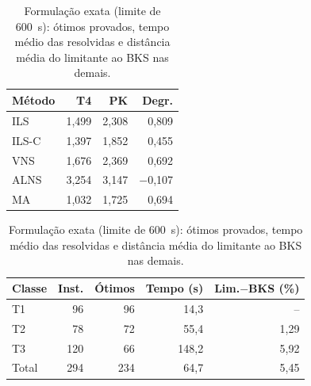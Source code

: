 \begin{table}[t]
\centering
\footnotesize
\setlength{\tabcolsep}{4pt}
\begin{minipage}[t]{0.42\textwidth}\centering
\caption{H3: gap médio ao BKS (\%) em T4 e PK e degradação (p.p.).}
\label{tab:h3}
\begin{tabular}{lrrr}
\toprule
Método & T4 & PK & Degr. \\
\midrule
ILS & 1,499 & 2,308 & 0,809 \\
ILS-C & 1,397 & 1,852 & 0,455 \\
VNS & 1,676 & 2,369 & 0,692 \\
ALNS & 3,254 & 3,147 & $-$0,107 \\
MA & 1,032 & 1,725 & 0,694 \\
\bottomrule
\end{tabular}
\end{minipage}\hfill
\begin{minipage}[t]{0.55\textwidth}\centering
\caption{Formulação exata (limite de 600~s): ótimos provados, tempo médio das resolvidas e distância média do limitante ao BKS nas demais.}
\label{tab:exato}
\begin{tabular}{lrrrr}
\toprule
Classe & Inst. & Ótimos & Tempo (s) & Lim.$-$BKS (\%) \\
\midrule
T1 & 96 & 96 & 14,3 & -- \\
T2 & 78 & 72 & 55,4 & 1,29 \\
T3 & 120 & 66 & 148,2 & 5,92 \\
\midrule
Total & 294 & 234 & 64,7 & 5,45 \\
\bottomrule
\end{tabular}
\end{minipage}
\end{table}

